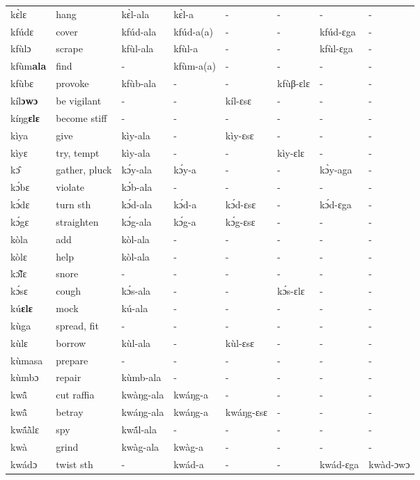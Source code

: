 \begin{sidewaystable}
\begin{longtable}{lp{3.5cm}llllll}
kɛ̀lɛ & hang & kɛ̀l-ala & kɛ̀l-a & - & - & - & - \\ 
kfúdɛ & cover & kfúd-ala & kfúd-a(a) & - & - & kfúd-ɛga & - \\
kfùlɔ & scrape & kfùl-ala & kfùl-a & - & - & kfùl-ɛga & - \\
kfùm{\bfseries ala} & find & - & kfùm-a(a) & - & - & - & - \\
kfùbɛ & provoke & kfùb-ala & - & - &  kfùβ-ɛlɛ & - & - \\
kíl{\bfseries ɔwɔ} & be vigilant & - & - & kíl-ɛsɛ & - & - & - \\
kíŋg{\bfseries ɛlɛ} & become stiff & - & - & - & - & - & - \\
kìya & give & kìy-ala & - & kìy-ɛsɛ & - & - & - \\
kìyɛ & try, tempt & kìy-ala & - & - &  kìy-ɛlɛ & - & - \\
kɔ̂ & gather, pluck & kɔ́y-ala & kɔ́y-a & - & - & kɔ̀y-aga & - \\
kɔ́bɛ & violate & kɔ́b-ala & - & - & - & - & - \\
kɔ́dɛ & turn sth & kɔ́d-ala & kɔ́d-a & kɔ́d-ɛsɛ & - & kɔ́d-ɛga & - \\
kɔ́gɛ & straighten & kɔ́g-ala & kɔ́g-a & kɔ́g-ɛsɛ & - & - & - \\
kòla & add & kòl-ala & - & - & - & - & - \\
kòlɛ & help & kòl-ala & - & - & - & - & - \\
kɔ̃̂lɛ & snore & - & -  & - & - & - & - \\
kɔ́sɛ & cough & kɔ́s-ala & - & - & kɔ́s-ɛlɛ & - & - \\
kú{\bfseries ɛlɛ} & mock & kú-ala & - & - & -  & - & - \\
kùga & spread, fit & - & - & - &  - & - & - \\
kùlɛ & borrow & kùl-ala & - & kùl-ɛsɛ & - & - & - \\
kùmasa & prepare & - & - & - & - & - &  - \\
kùmbɔ & repair & kùmb-ala & - & - & - & - & - \\
kwã̂ & cut raffia & kwàŋg-ala & kwáŋg-a & - & - & - & - \\
kwã̂ & betray & kwáŋg-ala & kwáŋg-a & kwáŋg-ɛsɛ & - & - & - \\
kwã́ã̀lɛ & spy & kwã́l-ala  & - & - & - & - & - \\
kwà & grind & kwàg-ala & kwàg-a & - & - & - & - \\
kwádɔ & twist sth & - &  kwád-a & - & - & kwád-ɛga & kwàd-ɔwɔ \\

\end{longtable}
\end{sidewaystable}
